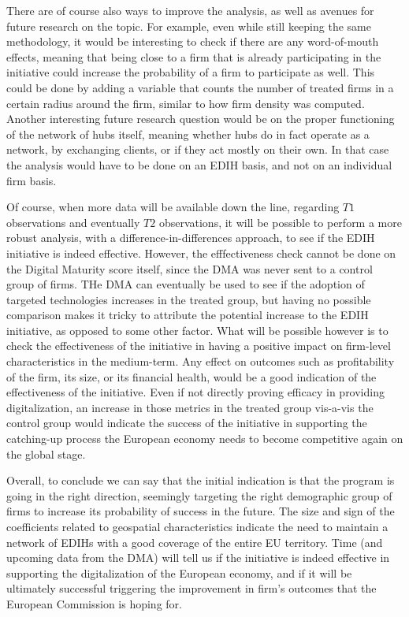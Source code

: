 \documentclass[12pt]{report}
\begin{document}
\par There are of course also ways to improve the analysis, as well as avenues for future research on the topic. For example, even while still keeping the same methodology, it would be interesting to check if there are any word-of-mouth effects, meaning that being close to a firm that is already participating in the initiative could increase the probability of a firm to participate as well. This could be done by adding a variable that counts the number of treated firms in a certain radius around the firm, similar to how firm density was computed. Another interesting future research question would be on the proper functioning of the network of hubs itself, meaning whether hubs do in fact operate as a network, by exchanging clients, or if they act mostly on their own. In that case the analysis would have to be done on an EDIH basis, and not on an individual firm basis. 
\par Of course, when more data will be available down the line, regarding $T1$ observations and eventually $T2$ observations, it will be possible to perform a more robust analysis, with a difference-in-differences approach, to see if the EDIH initiative is indeed effective. However, the efffectiveness check cannot be done on the Digital Maturity score itself, since the DMA was never sent to a control group of firms. THe DMA can eventually be used to see if the adoption of targeted technologies increases in the treated group, but having no possible comparison makes it tricky to attribute the potential increase to the EDIH initiative, as opposed to some other factor.
What will be possible however is to check the effectiveness of the initiative in having a positive impact on firm-level characteristics in the medium-term. Any effect on outcomes such as profitability of the firm, its size, or its financial health, would be a good indication of the effectiveness of the initiative. Even if not directly proving efficacy in providing digitalization, an increase in those metrics in the treated group vis-a-vis the control group would indicate the success of the initiative in supporting the catching-up process the European economy needs to become competitive again on the global stage.
\par Overall, to conclude we can say that the initial indication is that the program is going in the right direction, seemingly targeting the right demographic group of firms to increase its probability of success in the future. The size and sign of the coefficients related to geospatial characteristics indicate the need to maintain a network of EDIHs with a good coverage of the entire EU territory. Time (and upcoming data from the DMA) will tell us if the initiative is indeed effective in supporting the digitalization of the European economy, and if it will be ultimately successful triggering the improvement in firm's outcomes that the European Commission is hoping for. 









\end{document}
